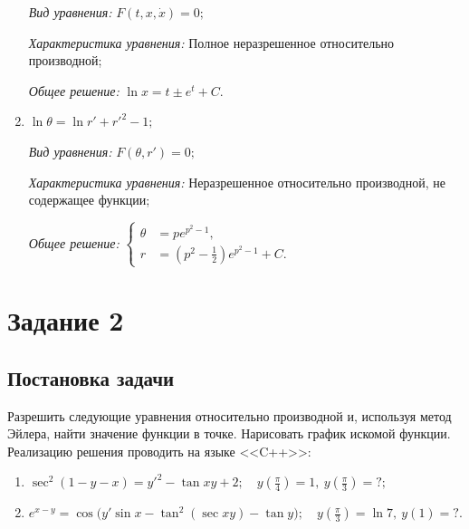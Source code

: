 \documentclass[14pt, a4paper, titlepage, fleqn]{extarticle}
\begin{document}
\begin{enumerate}
                    \textit{Вид уравнения:} \( F \left( t, x, \dot{x} \right) = 0; \)

                    \textit{Характеристика уравнения:}
                        Полное неразрешенное относительно производной;

                    \textit{Общее решение:} \( \ln{x} = t \pm e^t + C. \)

                
                \item \( \ln{\theta} = \ln{r'} + r'^2 - 1; \)
                
                    \textit{Вид уравнения:} \( F \left( \theta, r' \right) = 0; \)

                    \textit{Характеристика уравнения:}
                        Неразрешенное относительно производной, не содержащее функции;

                    \textit{Общее решение:}
                        \(
                            \left\lbrace
                                \begin{aligned}
                                    \theta &= p e^{p^2-1}, \\
                                    r &= \left( p^2 - \frac{1}{2} \right) e^{p^2-1} + C.
                                \end{aligned}
                            \right.    
                        \)

            \end{enumerate}

            
    \pagebreak

    \section{Задание 2}
        \subsection{Постановка задачи}
            Разрешить следующие уравнения относительно производной и, используя метод Эйлера, найти значение функции в точке. Нарисовать график искомой функции. Реализацию решения проводить на языке <<C++>>:

            \begin{enumerate}
                \item \( \sec^2{(1 -y- x)} = y'^2 - \tan{xy} + 2; \quad y \left( \frac{\pi}{4} \right) = 1, ~ y \left( \frac{\pi}{3} \right) = ?;  \)
                \item \( e^{x-y} = \cos\big( y' \sin{x} - \tan^2(\sec{xy}) - \tan{y} \big); \quad y \left( \frac{\pi}{3} \right) = \ln 7, ~ y(1) = ?. \)
            \end{enumerate}
\end{document}

